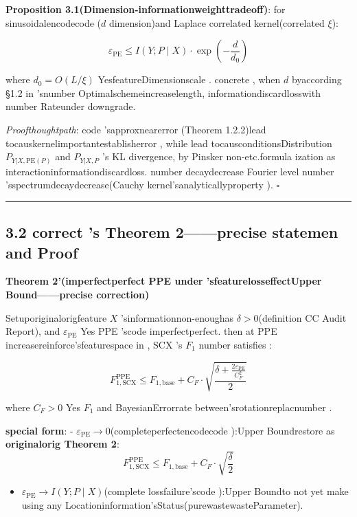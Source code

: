 \documentclass[
  12pt,
]{article}
\providecommand{\tightlist}{%
  \setlength{\itemsep}{0pt}\setlength{\parskip}{0pt}}
\begin{document}
\textbf{Proposition 3.1(Dimension-informationweighttradeoff)}: for  sinusoidalencodecode (\(d\) dimension)and  Laplace
correlated kernel(correlated  \(\xi\)):

\[\varepsilon_{\text{PE}} \leq I(Y; P \mid X) \cdot \exp\left(-\frac{d}{d_0}\right)\]

where \(d_0 = O(L/\xi)\) YesfeatureDimensionscale . concrete , when  \(d\) byaccording §1.2
in 'snumber Optimalschemeincreaselength, informationdiscardlosswith number Rateunder downgrade. 

\emph{Proofthoughtpath}: code 'sapproxnearerror (Theorem
1.2.2)lead tocauskernelimportantestablisherror , while lead tocausconditionsDistribution \(P_{Y|X,\text{PE}(P)}\) and 
\(P_{Y|X,P}\) 's KL divergence, by  Pinsker
non-etc.formula ization as interactioninformationdiscardloss. number decaydecrease Fourier level number 'sspectrumdecaydecrease(Cauchy
kernel'sanalyticallyproperty ). \(\square\)

\begin{center}\rule{0.5\linewidth}{0.5pt}\end{center}

\subsection{3.2 correct 's Theorem
2------precise statemen and Proof}\label{ux4feeux6b63ux7684-theorem-2ux7cbeux786eux9648ux8ff0ux548cux8bc1ux660e}

\textbf{Theorem 2'(imperfectperfect PPE under 'sfeaturelosseffectUpper Bound------precise correction)}

Setuporiginalorigfeature \(X\) 'sinformationnon-enoughas  \(\delta > 0\)(definition  CC Audit Report), and 
\(\varepsilon_{\text{PE}}\) Yes PPE 'scode imperfectperfect. then at  PPE
increasereinforce'sfeaturespace in , SCX 's \(F_1\) number satisfies : 

\[\boxed{F_{1,\text{SCX}}^{\text{PPE}} \leq F_{1,\text{base}} + C_F \cdot \sqrt{\frac{\delta + \frac{2\varepsilon_{\text{PE}}}{C_F^2}}{2}}}\]

where \(C_F > 0\) Yes \(F_1\) and BayesianErrorrate between'srotationreplacnumber . 

\textbf{special form}:  -
\(\varepsilon_{\text{PE}} \to 0\)(completeperfectencodecode ):Upper Boundrestore as  \textbf{originalorig
Theorem 2}: 
\[F_{1,\text{SCX}}^{\text{PPE}} \leq F_{1,\text{base}} + C_F \cdot \sqrt{\frac{\delta}{2}}\]

\begin{itemize}
\tightlist
\item
  \(\varepsilon_{\text{PE}} \to I(Y; P \mid X)\)(complete lossfailure'scode ):Upper Boundto not yet make using any Locationinformation'sStatus(purewastewasteParameter). 
\end{itemize}
\end{document}
